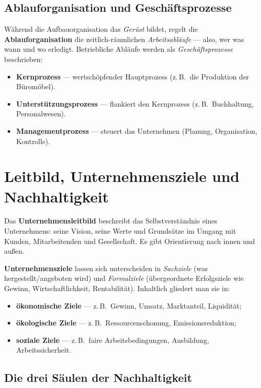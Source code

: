\documentclass[11pt, a4paper]{article}
\begin{document}
\subsection{Ablauforganisation und Geschäftsprozesse}

Während die Aufbauorganisation das \emph{Gerüst} bildet, regelt die
\textbf{Ablauforganisation} die zeitlich-räumlichen \emph{Arbeitsabläufe} --- also, wer
was wann und wo erledigt. Betriebliche Abläufe werden als \emph{Geschäftsprozesse}
beschrieben:

\begin{itemize}
  \item \textbf{Kernprozess} --- wertschöpfender Hauptprozess (z.\,B.\ die Produktion der
    Büromöbel).
  \item \textbf{Unterstützungsprozess} --- flankiert den Kernprozess (z.\,B.\ Buchhaltung,
    Personalwesen).
  \item \textbf{Managementprozess} --- steuert das Unternehmen (Planung, Organisation,
    Kontrolle).
\end{itemize}

\section{Leitbild, Unternehmensziele und Nachhaltigkeit}

Das \textbf{Unternehmensleitbild} beschreibt das Selbstverständnis eines Unternehmens:
seine Vision, seine Werte und Grundsätze im Umgang mit Kunden, Mitarbeitenden und
Gesellschaft. Es gibt Orientierung nach innen und außen.

\textbf{Unternehmensziele} lassen sich unterscheiden in \emph{Sachziele} (was
hergestellt/angeboten wird) und \emph{Formalziele} (übergeordnete Erfolgsziele wie
Gewinn, Wirtschaftlichkeit, Rentabilität). Inhaltlich gliedert man sie in:

\begin{itemize}
  \item \textbf{ökonomische Ziele} --- z.\,B.\ Gewinn, Umsatz, Marktanteil, Liquidität;
  \item \textbf{ökologische Ziele} --- z.\,B.\ Ressourcenschonung, Emissions\-reduktion;
  \item \textbf{soziale Ziele} --- z.\,B.\ faire Arbeitsbedingungen, Ausbildung,
    Arbeits\-sicherheit.
\end{itemize}

\subsection{Die drei Säulen der Nachhaltigkeit}
\end{document}
